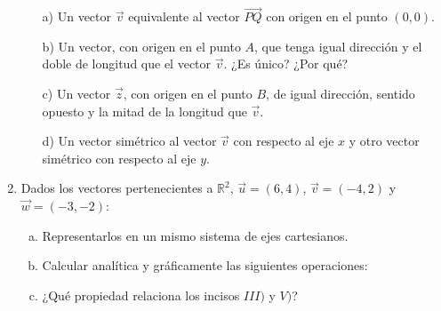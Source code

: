 \documentclass[11pt]{article}
\begin{document}
\begin{enumerate}[\hspace{-3mm}$1)$]
\begin{center}
\end{center}  


   \begin{itemize}
        \item[a)] Un vector $\vec{v}$ equivalente al vector $\overrightarrow{PQ}$ con origen en el punto $(0, 0)$.
        \item[b)] Un vector, con origen en el punto $A$, que tenga igual dirección y el doble de longitud que el vector $\vec{v}$. ¿Es único? ¿Por qué?
        \item[c)] Un vector $\vec{z}$, con origen en el punto $B$, de igual dirección, sentido opuesto y la mitad de la longitud que $\vec{v}$.
        \item[d)] Un vector simétrico al vector $\vec{v}$ con respecto al eje $x$ y otro vector simétrico con respecto al eje $y$.
    \end{itemize}






\item Dados los vectores pertenecientes a $\mathbb{R}^2$, $\vec{u} = (6, 4)$, $\vec{v} = (-4, 2)$ y $\vec{w} = (-3, -2)$:

    \begin{enumerate}[a)] 
        \item Representarlos en un mismo sistema de ejes cartesianos.
        \item Calcular analítica y gráficamente las siguientes operaciones:
            \begin{enumerate}[i)]
            \end{enumerate}
        \item ¿Qué propiedad relaciona los incisos {\scriptsize$III)$ }y {\scriptsize$V)$}?
    \end{enumerate}










\end{enumerate}
\end{document}
